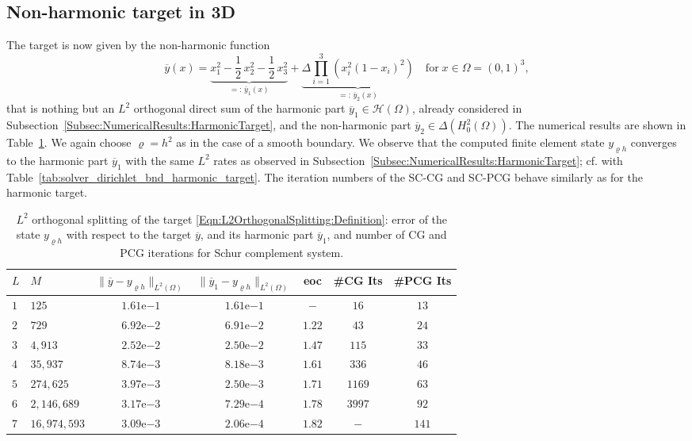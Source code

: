 \documentclass{article}
\numberwithin{equation}{section}
\begin{document}
\subsection{Non-harmonic target in 3D}
\label{Subsec:NumericalResults:L2OrthogonalSplitting}
The target is now given by the non-harmonic function
\begin{equation}
  \label{Eqn:L2OrthogonalSplitting:Definition}
  \overline{y}(x) = \underbrace{x_1^2-\frac{1}{2} \, x_2^2-
    \frac{1}{2} \, x_3^2}_{=: \, \overline{y}_1(x)}+
  \underbrace{
    \Delta\prod_{i=1}^3\left(
    x_i^2(1-x_i)^2
    \right)}_{=: \, \overline{y}_2(x)} \quad \mbox{for}
    \; x  \in \Omega = (0,1)^3,
\end{equation}
that is nothing but an $L^2$ orthogonal direct sum of the harmonic part 
$\overline{y}_1 \in \mathcal{H}(\Omega)$, already considered in 
Subsection~\ref{Subsec:NumericalResults:HarmonicTarget}, 
and the non-harmonic part $ \overline{y}_2 \in \Delta (H^2_0(\Omega))$.
The numerical results are shown in Table~\ref{tab:solver_dirichlet_bnd_L2OrthogonalSplitting_target}.
We again choose $\varrho = h^2$ as in the case of a smooth boundary. 
We observe that the computed finite element state $y_{\varrho h}$ converges to 
the harmonic part $\overline{y}_1$ with the same $L^2$ rates as
observed in Subsection~\ref{Subsec:NumericalResults:HarmonicTarget}; 
cf. with Table~\ref{tab:solver_dirichlet_bnd_harmonic_target}.
The iteration numbers of the SC-CG and SC-PCG behave similarly as for the 
harmonic target.

\begin{table}[ht]
  {\small
      \begin{center}
    \begin{tabular}{llccccc}
      \hline
      $L$ & $M$ & $\|\overline{y} - y_{\varrho h}\|_{L^2(\Omega)}$
      &$\|\overline{y}_1 - y_{\varrho h}\|_{L^2(\Omega)}$
      & eoc &\#CG Its & \#PCG Its\\
      \hline
      $1$&$125$&$1.61$e$-1$ & $1.61$e$-1$ & $-$ &$16$  & $13$\\
      $2$&$729$&$6.92$e$-2$&$6.91$e$-2$& $1.22$  &$43$  & $24$\\
      $3$&$4,913$&$2.52$e$-2$&$2.50$e$-2$ & $1.47$ & $115$ & $33$\\
      $4$&$35,937$&$8.74$e$-3$& $8.18$e$-3$ & $1.61$ & $336$ &$46$ \\
      $5$&$274,625$&$3.97$e$-3$&$2.50$e$-3$ & $1.71$  &$1169$ &$63$ \\
      $6$&$2,146,689$&$3.17$e$-3$ & $7.29$e$-4$ & $1.78$ & $3997$ &$92$\\
      $7$&$16,974,593$&$3.09$e$-3$ & $2.06$e$-4$ & $1.82$ & $-$ &$141$\\
      \hline
    \end{tabular}
    \end{center}
    \caption{$L^2$ orthogonal splitting of the target
      \eqref{Eqn:L2OrthogonalSplitting:Definition}:  
      error of the state $y_{\varrho h}$ with respect to the target
      $\overline{y}$, and its harmonic part $\overline{y}_1$,
    and number
    of CG and PCG iterations for Schur complement system.}
    \label{tab:solver_dirichlet_bnd_L2OrthogonalSplitting_target}
    }
\end{table}
\end{document}
